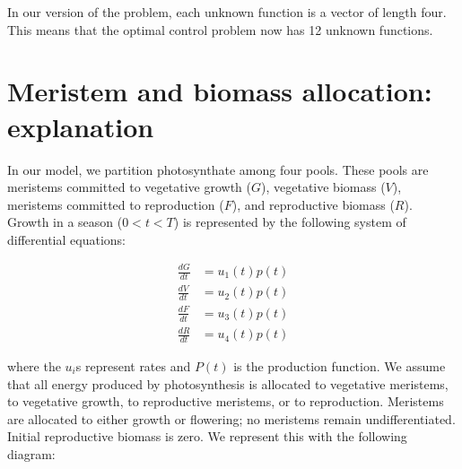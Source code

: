 \documentclass[12pt, oneside]{article}   	%
\begin{document}
\noindent In our version of the problem, each unknown function is a vector of length four. This means that the optimal control problem now has 12 unknown functions.

\section*{Meristem and biomass allocation: explanation} \label{mathrefs}

\noindent In our model, we partition photosynthate among four pools. These pools are meristems committed to vegetative growth ($G$), vegetative biomass ($V$), meristems committed to reproduction ($F$), and reproductive biomass ($R$). \\

\noindent Growth in a season ($0<t<T$) is represented by the following system of differential equations:

\begin{align}
\frac{dG}{dt} & = u_1(t) p(t) \label{eq:1}  \\
\frac{dV}{dt} & = u_2(t) p(t) \label{eq:2}   \\
\frac{dF}{dt} & = u_3(t) p(t) \label{eq:3}  \\
\frac{dR}{dt} & = u_4(t) p(t) \label{eq:4}  \end{align}

\noindent where the $u_i$s represent rates and $P(t)$ is the production function. We assume that all energy produced by photosynthesis is allocated to vegetative meristems, to vegetative growth, to reproductive meristems, or to reproduction. Meristems are allocated to either growth or flowering; no meristems remain undifferentiated. Initial reproductive biomass is zero. We represent this with the following diagram: \newline

  \newline
\end{document}
